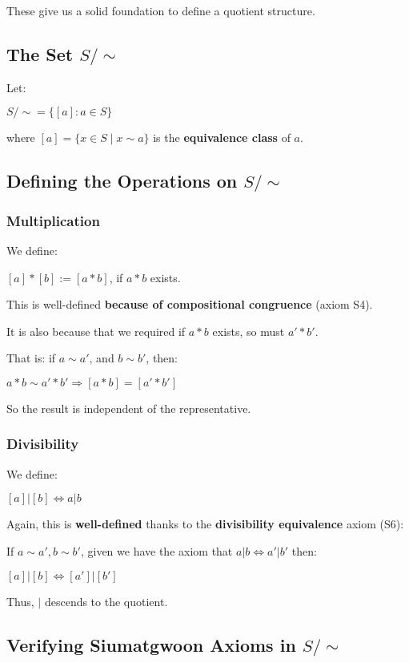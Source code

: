These give us a solid foundation to define a quotient structure.

\subsection{The Set $S/\sim$}

Let:

$S/\sim=\{[a]:a\in S\}$

where $[a]=\{x\in S\mid x\sim a\}$ is the \textbf{equivalence class} of $a$.

\subsection{Defining the Operations on $S/\sim$}

\subsubsection{Multiplication}

We define:

$[a]*[b]:=[a*b]$, if $a*b$ exists.

This is well-defined \textbf{because of compositional congruence} (axiom S4).

It is also because that we required if $a*b$ exists, so must $a'*b'$.

That is: if $a \sim a'$, and $b \sim b'$, then:

$a*b\sim a'*b'\Rightarrow [a*b]=[a'*b']$

So the result is independent of the representative.

\subsubsection{Divisibility}

We define:

$[a]|[b] \iff a|b$

Again, this is \textbf{well-defined} thanks to the \textbf{divisibility equivalence} axiom (S6):

If $a\sim a', b \sim b'$, given we have the axiom that $a|b \iff a'|b'$ then:

$[a]|[b] \iff [a']|[b']$

Thus, $|$ descends to the quotient.

\subsection{Verifying Siumatgwoon Axioms in $S/\sim$}

